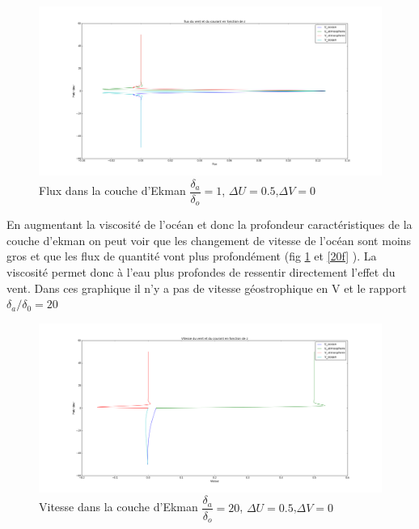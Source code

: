 \documentclass[11pt,a4paper,titlepage]{article}
\begin{document}
\begin{figure}[H]
\includegraphics[width = \linewidth]{DELTAODELTAA1FLUX}
\caption{Flux dans la couche d'Ekman $\dfrac{\delta_a}{\delta_o}=1$, $\Delta U = 0.5$,$\Delta V = 0$ }
\end{figure}

En augmentant la viscosité de l'océan et donc la profondeur caractéristiques de la couche d'ekman on peut voir que les changement de vitesse de l'océan sont moins gros et que les flux de quantité vont plus profondément (fig \ref{20} et  \ref{20f}  ). La viscosité permet donc à l'eau plus profondes de ressentir directement l'effet du vent. Dans ces graphique il n'y a pas de vitesse géostrophique en V et le rapport $\delta_a/\delta_0 = 20$ 

\begin{figure}[H]
\includegraphics[width = \linewidth]{DELTAODELTAA20}
\caption{Vitesse dans la couche d'Ekman $\dfrac{\delta_a}{\delta_o}=20$, $\Delta U = 0.5$,$\Delta V = 0$}
\label{20}
\end{figure}
\end{document}
